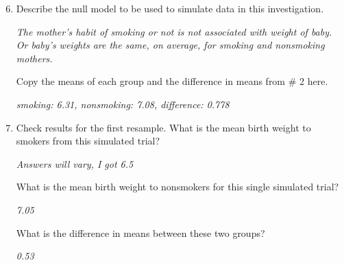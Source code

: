 \begin{enumerate}
  \setcounter{enumi}{5}
  \item  Describe the null model to be used to simulate data in this
    investigation. 
\begin{students}
\vspace{2cm}
\end{students}

\begin{key}
  {\it  The mother's habit of smoking or not is not
    associated with weight of baby. Or baby's weights are the same, on
    average, for smoking and nonsmoking mothers. }
\end{key}


    Copy the means of each group and the difference in means from \# 2
    here.
   
\begin{students}
\vspace{1cm}  
\end{students}

\begin{key}
  {\it  smoking: 6.31, nonsmoking: 7.08, difference: 0.778 }
\end{key}


\item  Check results for the first resample. What is the mean birth weight to
    smokers from this     simulated trial?  
\begin{students}
 \vspace{1cm}
\end{students}

\begin{key}
  {\it Answers will vary,  I got 6.5}
\end{key}

    
    What is the mean  birth weight to
    nonsmokers  for this single simulated trial?
\begin{students}
 \vspace{1cm}  
\end{students}

\begin{key}
  {\it 7.05}
\end{key}
            

    What is the difference in means between these two groups?
\begin{students}
 \vspace{1cm}
\end{students}

\begin{key}
  {\it 0.53}
\end{key}


\end{enumerate}

